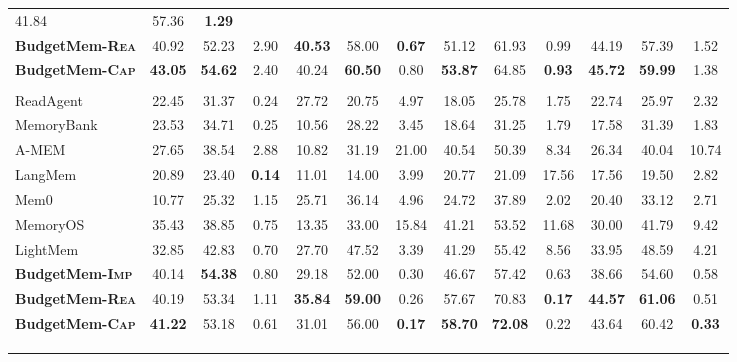 \begin{table}[t]
\begin{tabular}{lcccccccccccc}
        41.84 & 57.36 & \textbf{1.29} \\
        \rowcolor{row-highlight}\textbf{BudgetMem-\textsc{Rea}} &
        40.92 & 52.23 & 2.90 &
        \textbf{40.53} & 58.00 & \textbf{0.67} &
        51.12 & 61.93 & 0.99 &
        44.19 & 57.39 & 1.52 \\
        \rowcolor{row-highlight}\textbf{BudgetMem-\textsc{Cap}} &
        \textbf{43.05} & \textbf{54.62} & 2.40 &
        40.24 & \textbf{60.50} & 0.80 &
        \textbf{53.87} & 64.85 & \textbf{0.93} &
        \textbf{45.72} & \textbf{59.99} & 1.38 \\
        \midrule
        \rowcolor{white}
        \multicolumn{13}{l}{\textbf{Qwen3-Next-80B-A3B-Instruct}$^\dagger$} \\
        ReadAgent & 22.45 & 31.37 & 0.24 & 27.72 & 20.75 & 4.97 & 18.05 & 25.78 & 1.75 & 22.74 & 25.97& 2.32 \\
        MemoryBank & 23.53 & 34.71 & 0.25 & 10.56 & 28.22 & 3.45 & 18.64 & 31.25 & 1.79 & 17.58 & 31.39 & 1.83 \\
        A-MEM & 27.65 & 38.54 & 2.88 & 10.82 & 31.19 & 21.00 & 40.54 & 50.39 & 8.34 & 26.34& 40.04& 10.74\\
        LangMem & 20.89 & 23.40 & \textbf{0.14} & 11.01 & 14.00 & 3.99 & 20.77 & 21.09 & 17.56 & 17.56 & 19.50 & 2.82 \\
        Mem0 & 10.77 & 25.32 & 1.15 & 25.71 & 36.14 & 4.96 & 24.72 & 37.89 & 2.02 & 20.40 & 33.12 & 2.71 \\
        MemoryOS & 35.43 & 38.85 & 0.75 & 13.35 & 33.00 & 15.84 & 41.21 & 53.52 & 11.68 & 30.00 & 41.79 & 9.42 \\
        LightMem & 32.85 & 42.83 & 0.70 & 27.70 & 47.52 & 3.39 & 41.29 & 55.42 & 8.56& 33.95 & 48.59 & 4.21 \\
        \midrule
        \rowcolor{row-highlight}\textbf{BudgetMem-\textsc{Imp}} &
        40.14 & \textbf{54.38} & 0.80 &
        29.18 & 52.00 & 0.30 &
        46.67 & 57.42 & 0.63 &
        38.66 & 54.60 & 0.58 \\
        \rowcolor{row-highlight}\textbf{BudgetMem-\textsc{Rea}} &
        40.19 & 53.34 & 1.11 &
        \textbf{35.84} & \textbf{59.00} & 0.26 &
        57.67 & 70.83 & \textbf{0.17} &
        \textbf{44.57} & \textbf{61.06} & 0.51 \\
        \rowcolor{row-highlight}\textbf{BudgetMem-\textsc{Cap}} &
        \textbf{41.22} & 53.18 & 0.61 &
        31.01 & 56.00 & \textbf{0.17} &
        \textbf{58.70} & \textbf{72.08} & 0.22 &
        43.64 & 60.42 & \textbf{0.33} \\
        \bottomrule
        \rowcolor{white}\multicolumn{13}{l}{\small \textbf{粗体}表示每个基础模型分组中的最佳分数；“平均”为各指标在不同数据集上的均值。} \\
        \rowcolor{white}\multicolumn{13}{l}{
        \textbf{成本}通过汇总所有模型调用的词元，并采用相应模型的输入与输出词元价格计算。}\\
        \rowcolor{white}\multicolumn{13}{l}{\small $^\dagger$ 表示未使用该基础模型训练，仅进行迁移评估。} \\
    \end{tabular}
\end{table}
